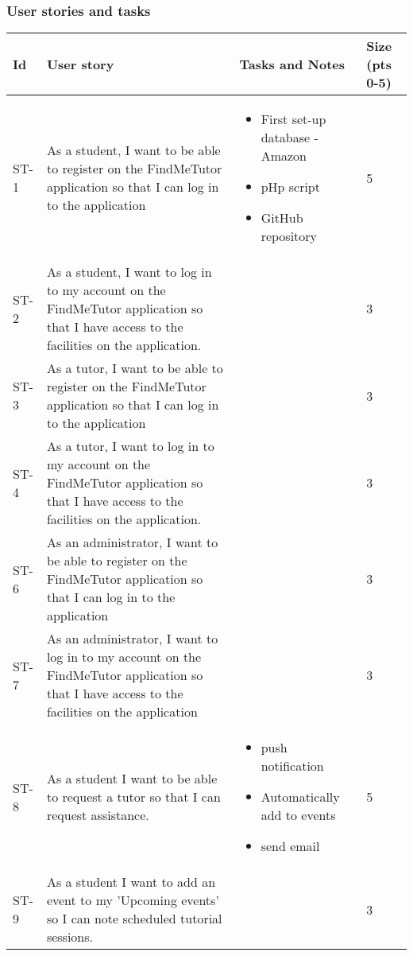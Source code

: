 \documentclass[12pt]{article}
\begin{document}
\subsubsection{User stories and tasks}
{
\centering
\begin{longtable}{| p{1cm} | p{7cm}| p{5cm} | p{1cm} |}
			\hline			
			\textbf{Id} & \textbf{User story} & \textbf{Tasks and Notes} & \textbf{Size (pts 0-5)}
			
			\\ \hline ST-1 & As a student, I want to be able to register on the FindMeTutor application so that I can log in to the application  & \begin{itemize}
\item First set-up database - Amazon
\item pHp script
\item GitHub repository
\end{itemize} & 5 
			\\ \hline ST-2 & As a student, I want to  log in to my account on the FindMeTutor application so that I have access to the facilities on the application.  &  & 3 
			\\ \hline ST-3 & As a tutor, I want to be able to register on the FindMeTutor application so that I can log in to the application  & & 3 
																\\ \hline ST-4 & As a tutor, I want to  log in to my account on the FindMeTutor application so that I have access to the facilities on the application.  &  & 3 
																\\ \hline ST-6 & As an administrator, I want to be able to register on the FindMeTutor application so that I can log in to the application  & & 3 
													\\ \hline ST-7 & As an administrator, I want to  log in to my account on the FindMeTutor application so that I have access to the facilities on the application  & &3 			

			\\ \hline ST-8 & As a student I want to be able to request a tutor so that I can request assistance. & \begin{itemize}
\item push notification
\item Automatically add to events
\item send email
\end{itemize} & 5 													
			\\ \hline ST-9 & As a student I want to add an event to my 'Upcoming events' so I can note scheduled tutorial sessions.  &  &3 
			

\end{longtable}}
\end{document}
